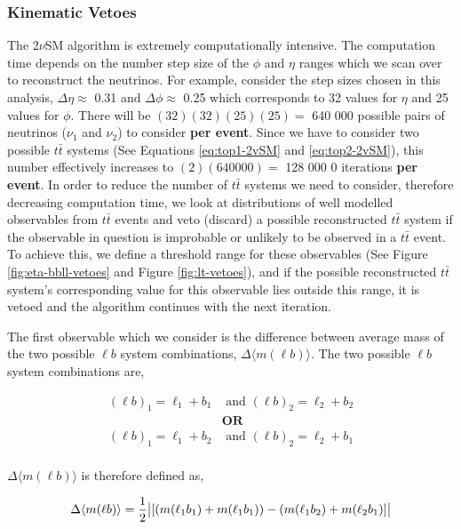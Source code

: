 \subsubsection{Kinematic Vetoes}
The 2$\nu$SM algorithm is extremely computationally intensive. The computation time depends on the number step size of the $\phi$ and $\eta$ ranges which we scan over to reconstruct the neutrinos. For example, consider the step sizes chosen in this analysis, $\Delta \eta \approx$ 0.31 and $\Delta \phi \approx$ 0.25 which corresponds to 32 values for $\eta$ and 25 values for $\phi$. There will be $(32)(32)(25)(25) = $ 640 000 possible pairs of neutrinos ($\nu_{1}$ and $\nu_{2}$) to consider \textbf{per event}. Since we have to consider two possible $t\bar{t}$ systems (See Equations \ref{eq:top1-2vSM} and \ref{eq:top2-2vSM}), this number effectively increases to $(2)(640000) = $ 128 000 0 iterations \textbf{per event}. In order to reduce the number of $t\bar{t}$ systems we need to consider, therefore decreasing computation time, we look at distributions of well modelled observables from $t\bar{t}$ events and veto (discard) a possible reconstructed $t\bar{t}$ system if the observable in question is improbable or unlikely to be observed in a $t\bar{t}$ event. To achieve this, we define a threshold range for these observables (See Figure \ref{fig:eta-bbll-vetoes} and Figure \ref{fig:lt-vetoes}), and if the possible reconstructed $t\bar{t}$ system's corresponding value for this observable lies outside this range, it is vetoed and the algorithm continues with the next iteration.


The first observable which we consider is the difference between average mass of the two possible $\ell b$ system combinations, $\Delta \langle m(\ell b)\rangle$. The two possible $\ell b$ system combinations are,

\begin{align}
    (\ell b)_{1} = \ell_{1} + b_{1} &\text{ and }  (\ell b)_{2}  = \ell_{2} + b_{2} \\
    &\textbf{OR}\nonumber\\ 
     (\ell b)_{1} = \ell_{1} + b_{2} &\text{ and }  (\ell b)_{2}  = \ell_{2} + b_{1} \\
\end{align}

$\Delta \langle m(\ell b) \rangle$ is therefore defined as,

\begin{equation}
    \Delta \langle m(\ell b) \rangle = \frac{1}{2} \abs{[( m(\ell_{1} b_{1}) + m(\ell_{1} b_{1}) ) - ( m(\ell_{1} b_{2}) + m(\ell_{2} b_{1}) ]}
\end{equation}

